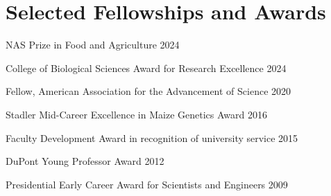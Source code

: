 \documentclass[letterpaper,10pt]{article}
\renewenvironment{itemize}{
  \begin{list}{}{
    \setlength{\leftmargin}{1.5em}
  }
}{
  \end{list}
}
\begin{document}
\section*{Selected Fellowships and Awards}
\setlength\itemsep{0ex}
\begin {itemize}
\setlength\itemsep{0ex}
\item NAS Prize in Food and Agriculture \hfill 2024
\item College of Biological Sciences Award for Research Excellence \hfill 2024
\item Fellow, American Association for the Advancement of Science \hfill 2020
\item Stadler Mid-Career Excellence in Maize Genetics Award \hfill 2016
\item Faculty Development Award in recognition of university service \hfill 2015
\item DuPont Young Professor Award \hfill 2012
\item Presidential Early Career Award for Scientists and Engineers \hfill 2009
\end{itemize}
\end{document}
